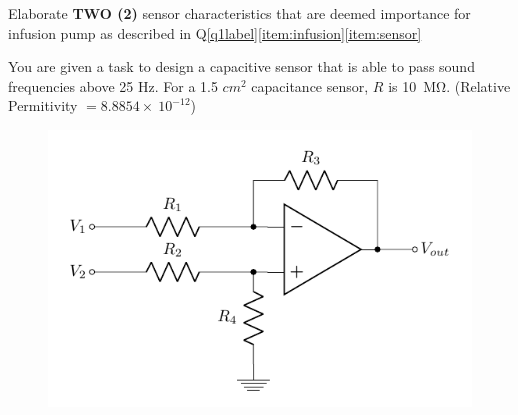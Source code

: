 \documentclass[12pt]{article}
\begin{document}
		
		\item Elaborate \textbf{TWO (2)} sensor characteristics that are deemed importance for infusion pump as described in Q\ref{q1label}\ref{item:infusion}\ref{item:sensor}
		
		

	\listclose %
	
	\item You are given a task to design a capacitive sensor that is able to pass sound frequencies above 25 Hz. For a 1.5 $cm^2$ capacitance sensor, $R$ is 10~\si{\mega\ohm}. (Relative Permitivity $= 8.8854 \times~10^{-12}$)
	
	
	\begin{figure}[H] %
		\centering
		\includegraphics{diffamp}
		\caption{\rajah}
		\label{fig:diffamp}
	\end{figure}
	
\listclose %

\end{document}
